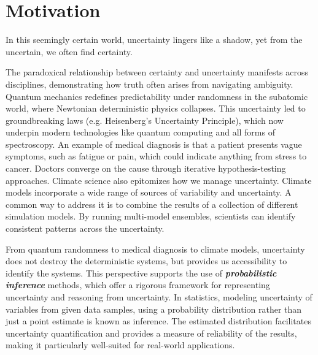 \section{Motivation} 
\label{sec:introduction:motivation}

\begin{highlightbox}
In this seemingly certain world, uncertainty lingers like a shadow, yet from the uncertain, we often find certainty.       
\end{highlightbox}  

The paradoxical relationship between certainty and uncertainty manifests across disciplines, demonstrating how truth often arises from navigating ambiguity. Quantum mechanics redefines predictability under randomness in the subatomic world, where Newtonian deterministic physics collapses. This uncertainty led to groundbreaking laws (e.g. Heisenberg's Uncertainty Principle), which now underpin modern technologies like quantum computing and all forms of spectroscopy. An example of medical diagnosis is that a patient presents vague symptoms, such as fatigue or pain, which could indicate anything from stress to cancer. Doctors converge on the cause through iterative hypothesis-testing approaches. Climate science also epitomizes how we manage uncertainty. Climate models incorporate a wide range of sources of variability and uncertainty. A common way to address it is to combine the results of a collection of different simulation models. By running multi-model ensembles, scientists can identify consistent patterns across the uncertainty.

From quantum randomness to medical diagnosis to climate models, uncertainty does not destroy the deterministic systems, but provides us accessibility to identify the systems. This perspective supports the use of {\bfseries\itshape probabilistic inference} methods, which offer a rigorous framework for representing uncertainty and reasoning from uncertainty. In statistics, modeling uncertainty of variables from given data samples, using a probability distribution rather than just a point estimate is known as inference. The estimated distribution facilitates uncertainty quantification and provides a measure of reliability of the results, making it particularly well-suited for real-world applications. 

